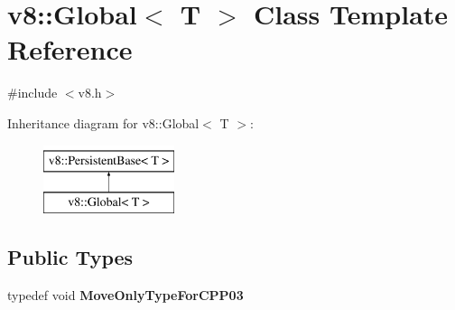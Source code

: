 \hypertarget{classv8_1_1Global}{}\section{v8\+:\+:Global$<$ T $>$ Class Template Reference}
\label{classv8_1_1Global}


{\ttfamily \#include $<$v8.\+h$>$}

Inheritance diagram for v8\+:\+:Global$<$ T $>$\+:\begin{figure}[H]
\begin{center}
\leavevmode
\includegraphics[height=2.000000cm]{classv8_1_1Global}
\end{center}
\end{figure}
\subsection*{Public Types}
\begin{DoxyCompactItemize}
\item 
\hypertarget{classv8_1_1Global_a295826e79781fe585904e652884db72f}{}typedef void {\bfseries Move\+Only\+Type\+For\+C\+P\+P03}\label{classv8_1_1Global_a295826e79781fe585904e652884db72f}

\end{DoxyCompactItemize}
